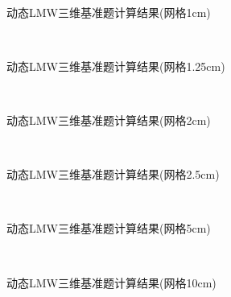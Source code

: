 \begin{figure}[H]
\centering
{}
\\[1cm]
\caption{动态LMW三维基准题计算结果(网格1cm)\label{fig:testresult.lwm.1}}
\end{figure}

\begin{figure}[H]
\centering
{}
\\[1cm]
\caption{动态LMW三维基准题计算结果(网格1.25cm)\label{fig:testresult.lwm.125}}
\end{figure}


\begin{figure}[H]
\centering
{}
\\[1cm]
\caption{动态LMW三维基准题计算结果(网格2cm)\label{fig:testresult.lwm.2}}
\end{figure}


\begin{figure}[H]
\centering
{}
\\[1cm]
\caption{动态LMW三维基准题计算结果(网格2.5cm)\label{fig:testresult.lwm.25}}
\end{figure}


\begin{figure}[H]
\centering
{}
\\[1cm]
\caption{动态LMW三维基准题计算结果(网格5cm)\label{fig:testresult.lwm.5}}
\end{figure}


\begin{figure}[H]
\centering
{}
\\[1cm]
\caption{动态LMW三维基准题计算结果(网格10cm)\label{fig:testresult.lwm.10}}
\end{figure}

